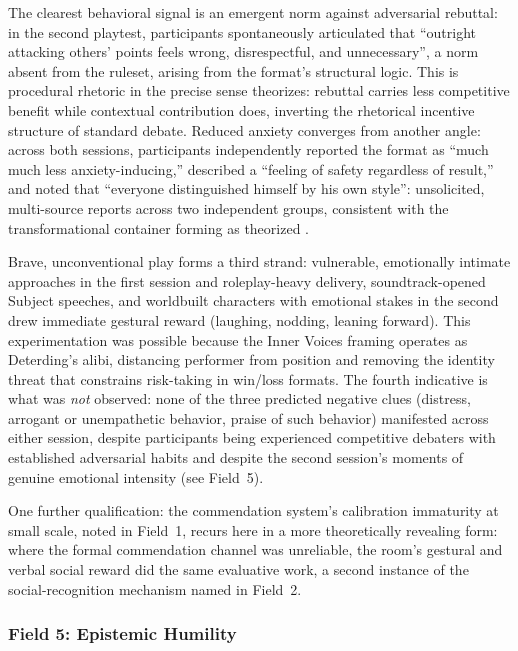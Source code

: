 The clearest behavioral signal is an emergent norm against adversarial rebuttal: in the second playtest, participants spontaneously articulated that ``outright attacking others' points feels wrong, disrespectful, and unnecessary'', a norm absent from the ruleset, arising from the format's structural logic. This is procedural rhetoric in the precise sense \textcite{bogost2007persuasive} theorizes: rebuttal carries less competitive benefit while contextual contribution does, inverting the rhetorical incentive structure of standard debate. Reduced anxiety converges from another angle: across both sessions, participants independently reported the format as ``much much less anxiety-inducing,'' described a ``feeling of safety regardless of result,'' and noted that ``everyone distinguished himself by his own style'': unsolicited, multi-source reports across two independent groups, consistent with the transformational container forming as theorized \parencite{bowman2021magic, bowman2025transformative}.

Brave, unconventional play forms a third strand: vulnerable, emotionally intimate approaches in the first session and roleplay-heavy delivery, soundtrack-opened Subject speeches, and worldbuilt characters with emotional stakes in the second drew immediate gestural reward (laughing, nodding, leaning forward). This experimentation was possible because the Inner Voices framing operates as Deterding's \parencite{deterding2017alibis} alibi, distancing performer from position and removing the identity threat that constrains risk-taking in win/loss formats. The fourth indicative is what was \textit{not} observed: none of the three predicted negative clues (distress, arrogant or unempathetic behavior, praise of such behavior) manifested across either session, despite participants being experienced competitive debaters with established adversarial habits and despite the second session's moments of genuine emotional intensity (see Field~5).

One further qualification: the commendation system's calibration immaturity at small scale, noted in Field~1, recurs here in a more theoretically revealing form: where the formal commendation channel was unreliable, the room's gestural and verbal social reward did the same evaluative work, a second instance of the social-recognition mechanism named in Field~2.

\subsubsection{Field 5: Epistemic Humility}

